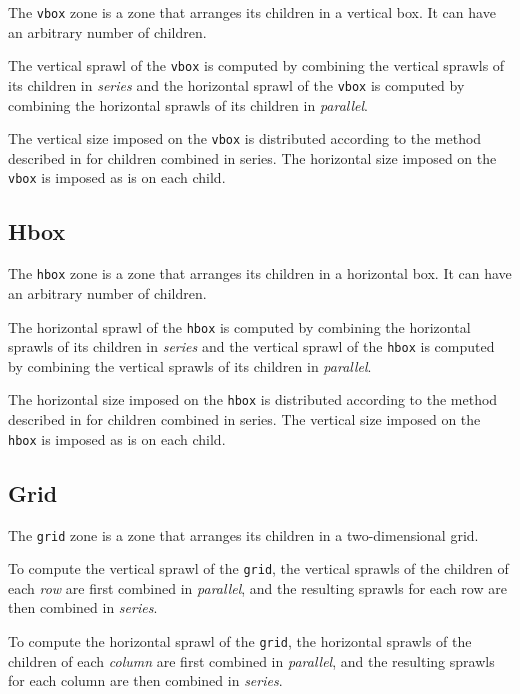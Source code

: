 \documentclass{report}
\def\code#1{\texttt{#1}}
\begin{document}
The \code{vbox} zone is a zone that arranges its children in a
vertical box.  It can have an arbitrary number of children.

The vertical sprawl of the \code{vbox} is computed by combining the
vertical sprawls of its children in \emph{series} and the horizontal
sprawl of the \code{vbox} is computed by combining the horizontal
sprawls of its children in \emph{parallel}.

The vertical size imposed on the \code{vbox} is distributed according
to the method described in 
for children combined in series.  The horizontal size imposed on the
\code{vbox} is imposed as is on each child. 

\subsection{Hbox}
\label{sec-zones-layout-hbox}

The \code{hbox} zone is a zone that arranges its children in a
horizontal box.  It can have an arbitrary number of children.

The horizontal sprawl of the \code{hbox} is computed by combining the
horizontal sprawls of its children in \emph{series} and the vertical
sprawl of the \code{hbox} is computed by combining the vertical
sprawls of its children in \emph{parallel}.

The horizontal size imposed on the \code{hbox} is distributed according
to the method described in 
for children combined in series.  The vertical size imposed on the
\code{hbox} is imposed as is on each child. 

\subsection{Grid}
\label{sec-zones-layout-grid}

The \code{grid} zone is a zone that arranges its children in a
two-dimensional grid.  

To compute the vertical sprawl of the \code{grid}, the vertical
sprawls of the children of each \emph{row} are first combined in
\emph{parallel}, and the resulting sprawls for each row are then
combined in \emph{series}.  

To compute the horizontal sprawl of the \code{grid}, the horizontal
sprawls of the children of each \emph{column} are first combined in
\emph{parallel}, and the resulting sprawls for each column are then
combined in \emph{series}.
\end{document}
